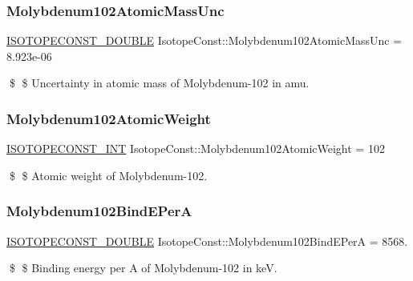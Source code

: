 \subsubsection{\texorpdfstring{Molybdenum102\+Atomic\+Mass\+Unc}{Molybdenum102AtomicMassUnc}}
{\footnotesize\ttfamily \mbox{\hyperlink{group___isotope_const-_macros_ga8f45a7272ce02c0b4c65c44636ed719a}{I\+S\+O\+T\+O\+P\+E\+C\+O\+N\+S\+T\+\_\+\+D\+O\+U\+B\+LE}} Isotope\+Const\+::\+Molybdenum102\+Atomic\+Mass\+Unc = 8.\+923e-\/06}

\$ \$ Uncertainty in atomic mass of Molybdenum-\/102 in amu. \mbox{\label{group___isotope_const-_molybdenum-_mo102_gaded69b0268bd739e93412ba1d31520a3}} 
\subsubsection{\texorpdfstring{Molybdenum102\+Atomic\+Weight}{Molybdenum102AtomicWeight}}
{\footnotesize\ttfamily \mbox{\hyperlink{group___isotope_const-_macros_ga5f18360b3e99483a35c32d789e62621c}{I\+S\+O\+T\+O\+P\+E\+C\+O\+N\+S\+T\+\_\+\+I\+NT}} Isotope\+Const\+::\+Molybdenum102\+Atomic\+Weight = 102}

\$ \$ Atomic weight of Molybdenum-\/102. \mbox{\label{group___isotope_const-_molybdenum-_mo102_ga04fb19c22c83e4f10a9e2b3ee17d1ce6}} 
\subsubsection{\texorpdfstring{Molybdenum102\+Bind\+E\+PerA}{Molybdenum102BindEPerA}}
{\footnotesize\ttfamily \mbox{\hyperlink{group___isotope_const-_macros_ga8f45a7272ce02c0b4c65c44636ed719a}{I\+S\+O\+T\+O\+P\+E\+C\+O\+N\+S\+T\+\_\+\+D\+O\+U\+B\+LE}} Isotope\+Const\+::\+Molybdenum102\+Bind\+E\+PerA = 8568.}

\$ \$ Binding energy per A of Molybdenum-\/102 in keV. \mbox{\label{group___isotope_const-_molybdenum-_mo102_ga053c88dbcae9cad5e8be1ad7f7e8f947}} 
